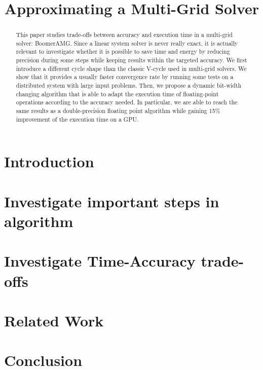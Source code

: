 \documentclass[10pt,conference]{IEEEtran}
\title{Approximating a Multi-Grid Solver}
\author{

    \IEEEauthorblockN{Valentin Le F\`{e}vre}
    \IEEEauthorblockA{
        \'{E}cole Normale Supérieure de Lyon\\
        valentin.le-fevre@ens-lyon.fr}
    \and
    \IEEEauthorblockN{Leonardo Bautista-Gomez}
    \IEEEauthorblockA{
        Barcelona Supercomputing Center (BSC)\\
        leonardo.bautista@bsc.es}
    \and
    \IEEEauthorblockN{Marc Casas}
    \IEEEauthorblockA{
        Barcelona Supercomputing Center (BSC)\\
        marc.casas@bsc.es}
}
\begin{document}
\maketitle
\begin{abstract}
    This paper studies trade-offs between accuracy and execution time in a
    multi-grid solver: BoomerAMG. Since a linear system solver is never really
    exact, it is actually relevant to investigate whether it is possible to
    save time and energy by reducing precision during some steps while keeping
    results within the targeted accuracy. We first introduce a different cycle
    shape than the classic V-cycle used in multi-grid solvers. We show that it
    provides a usually faster convergence rate by running some tests on a
    distributed system with large input problems. Then, we propose a dynamic
    bit-width changing algorithm that is able to adapt the execution time of
    floating-point operations according to the accuracy needed. In particular,
    we are able to reach the same results as a double-precision floating point
    algorithm while gaining 15\% improvement of the execution time on a GPU.
\end{abstract}

\section{Introduction}
\label{sec:intro}



%
%

\section{Investigate important steps in algorithm}
\label{sec:algo}





\section{Investigate Time-Accuracy trade-offs}
\label{sec:accuracy}







\section{Related Work}
\label{sec:related}



\section{Conclusion}
\label{sec:conclusions}





\end{document}
